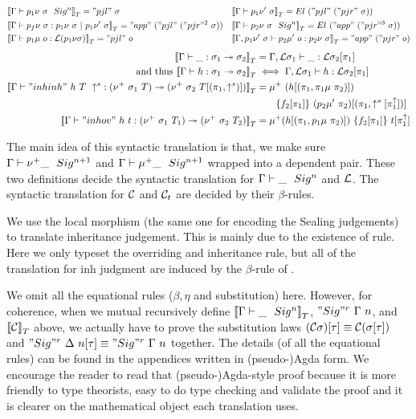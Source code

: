 \begin{align*}
  &{{\llbracket {{ {\Gamma} \vdash {p_1\nu~\sigma} \ \ Sig^{n} }} \rrbracket}_T} = "pjl"~\sigma 
  &&{{\llbracket {{ {\Gamma} \vdash {p_1\nu'~\sigma} }} \rrbracket}_T} = El~("pjl"~("pjr"~\sigma)) \\
  &{{\llbracket {{ {\Gamma} \vdash {p_f\nu~\sigma} : {p_1\nu~\sigma} \ |\ {p_1\nu'~\sigma} }} \rrbracket}_T} = "app"~("pjl"~("pjr"^2~\sigma)) 
  &&{{\llbracket {{ {\Gamma} \vdash {p_2\nu~\sigma} \ \ Sig^{n} }} \rrbracket}_T} = El~("app"~("pjr"^3~\sigma)) \\ 
  &{{\llbracket {{ {\Gamma} \vdash {p_1\mu~o} : {{\mathcal{L}}(p_1\nu\sigma)} }} \rrbracket}_T} = "pjl"~o 
  &&{{\llbracket {{ {\Gamma, p_1\nu'~\sigma} \vdash {p_2\mu'~o} : {p_2\nu~\sigma} }} \rrbracket}_T} = "app"~("pjr"~o)
\end{align*}
\begin{align*}
  {{\llbracket {{ {\Gamma} \vdash {\_} : {\sigma_1} \twoheadrightarrow {\sigma_2}}} \rrbracket}_T} &= { {\Gamma, {\mathcal{L}}\sigma_1} \vdash {\_} : {{\mathcal{L}}\sigma_2[\pi_1]} } \\ \text{ and thus } {{\llbracket {{ {\Gamma} \vdash {h} : {\sigma_1} \twoheadrightarrow {\sigma_2}}} \rrbracket}_T} &\iff  { {\Gamma, {\mathcal{L}}\sigma_1} \vdash {h} : {{\mathcal{L}}\sigma_2[\pi_1]} } \\
  {{\llbracket {{ {\Gamma} \vdash {"inhinh"~h~T~\uparrow^s} : {(\nu^+ \  \sigma_1 \  T)} \twoheadrightarrow {(\nu^+ \  \sigma_2 \  T[(\pi_1, \uparrow^s)])}}} \rrbracket}_T} &= \mu^+~(h[(\pi_1,\pi_1\mu~\pi_2)])\\ &\quad \quad \{f_2[\pi_1]\}~(p_2\mu'~\pi_2)[(\pi_1, \uparrow^s[\pi_1^{\uparrow}])] \\
  {{\llbracket {{ {\Gamma} \vdash {"inhov"~h~t} : {(\nu^+ \  \sigma_1 \  T_1)} \twoheadrightarrow {(\nu^+ \  \sigma_2\  T_2)}}} \rrbracket}_T} &= \mu^+ (h[(\pi_1, p_1\mu~\pi_2)])~\{f_2[\pi_1]\}~t[\pi_1^{\uparrow}]
\end{align*}

The main idea of this syntactic translation is that, we make sure
${ {\Gamma} \vdash {\nu^+ \_ } \ \ Sig^{n+1} }$ and ${ {\Gamma} \vdash {\mu^+ \_} \ \ Sig^{n+1} }$
wrapped into a dependent pair. These two definitions decide the
syntactic translation for ${ {\Gamma} \vdash {\_} \ \ Sig^{n} }$ and ${\mathcal{L}}$. The
syntactic translation for ${\mathcal{C}}$ and ${\mathcal{C}_t}$ are decided by their
$\beta$-rules. 

We use the local morphism (the same one for encoding the Sealing
judgements) to translate inheritance judgement. This is mainly due to
the existence of  rule. Here we only typeset the overriding
and inheritance rule, but all of the translation for inh judgment are
induced by the $\beta$-rule of .

We omit all the equational rules ($\beta,\eta$ and substitution) here.
However, for coherence, when we mutual recursively define
${{\llbracket {{ {\Gamma} \vdash {\_} \ \ Sig^{n} }} \rrbracket}_T}$, ${{ "Sig"^r~{\Gamma}~{n} }} $, and
${{\llbracket {{\mathcal{C}}} \rrbracket}_T}$ above, we actually have to prove the substitution laws
$({\mathcal{C}}\sigma)[\tau]\equiv {\mathcal{C}}(\sigma[\tau])$ and ${ "Sig"^r~{\Delta}~{n} }[\tau]
\equiv { "Sig"^r~{\Gamma}~{n} }$ together. The details (of all the equational
rules) can be found in the appendices written in (pseudo-)Agda form. We
encourage the reader to read that (pseudo-)Agda-style proof because it
is more friendly to type theorists, easy to do type checking and
validate the proof and it is clearer on the mathematical object each
translation uses.


